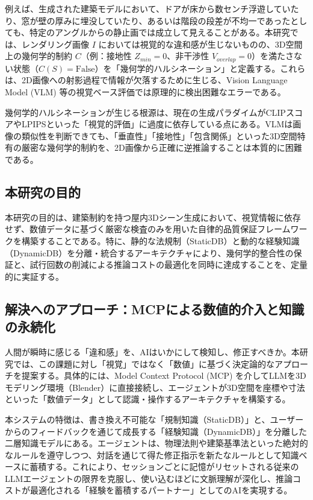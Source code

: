 \documentclass[dvipdfmx, a4paper, 9pt]{deimj}
\begin{document}
例えば、生成された建築モデルにおいて、ドアが床から数センチ浮遊していたり、窓が壁の厚みに埋没していたり、あるいは階段の段差が不均一であったとしても、特定のアングルからの静止画では成立して見えることがある。本研究では、レンダリング画像 $I$ においては視覚的な違和感が生じないものの、3D空間上の幾何学的制約 $C$（例：接地性 $Z_{min}=0$、非干渉性 $V_{overlap}=0$）を満たさない状態（$C(S) = \text{False}$）を「幾何学的ハルシネーション」と定義する。これらは、2D画像への射影過程で情報が欠落するために生じる、Vision Language Model (VLM) 等の視覚ベース評価では原理的に検出困難なエラーである。

幾何学的ハルシネーションが生じる根源は、現在の生成パラダイムがCLIPスコア\cite{radford2021clip}やLPIPS\cite{zhang2018lpips}といった「視覚的評価」に過度に依存している点にある。VLMは画像の類似性を判断できても、「垂直性」「接地性」「包含関係」といった3D空間特有の厳密な幾何学的制約を、2D画像から正確に逆推論することは本質的に困難である。

\subsection{本研究の目的}

本研究の目的は、建築制約を持つ屋内3Dシーン生成において、視覚情報に依存せず、数値データに基づく厳密な検査のみを用いた自律的品質保証フレームワークを構築することである。特に、静的な法規制（StaticDB）と動的な経験知識（DynamicDB）を分離・統合するアーキテクチャにより、幾何学的整合性の保証と、試行回数の削減による推論コストの最適化を同時に達成することを、定量的に実証する。

\subsection{解決へのアプローチ：MCPによる数値的介入と知識の永続化}

人間が瞬時に感じる「違和感」を、AIはいかにして検知し、修正すべきか。本研究では、この課題に対し「視覚」ではなく「数値」に基づく決定論的なアプローチを提案する。具体的には、Model Context Protocol (MCP)\cite{anthropic2024mcp} を介してLLMを3Dモデリング環境（Blender）に直接接続し、エージェントが3D空間を座標や寸法といった「数値データ」として認識・操作するアーキテクチャを構築する。

本システムの特徴は、書き換え不可能な「規制知識（StaticDB）」と、ユーザーからのフィードバックを通じて成長する「経験知識（DynamicDB）」を分離した二層知識モデルにある。エージェントは、物理法則や建築基準法といった絶対的なルールを遵守しつつ、対話を通じて得た修正指示を新たなルールとして知識ベースに蓄積する。これにより、セッションごとに記憶がリセットされる従来のLLMエージェントの限界を克服し、使い込むほどに文脈理解が深化し、推論コストが最適化される「経験を蓄積するパートナー」としてのAIを実現する。
\end{document}
